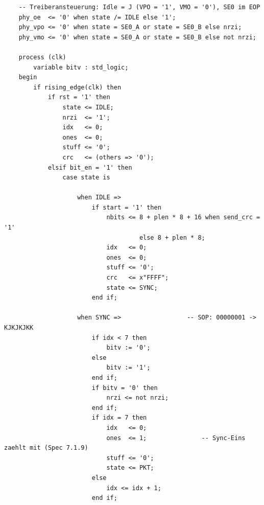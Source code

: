 \documentclass[a4paper,11pt]{article}
\begin{document}
\begin{verbatim}
    -- Treiberansteuerung: Idle = J (VPO = '1', VMO = '0'), SE0 im EOP
    phy_oe  <= '0' when state /= IDLE else '1';
    phy_vpo <= '0' when state = SE0_A or state = SE0_B else nrzi;
    phy_vmo <= '0' when state = SE0_A or state = SE0_B else not nrzi;

    process (clk)
        variable bitv : std_logic;
    begin
        if rising_edge(clk) then
            if rst = '1' then
                state <= IDLE;
                nrzi  <= '1';
                idx   <= 0;
                ones  <= 0;
                stuff <= '0';
                crc   <= (others => '0');
            elsif bit_en = '1' then
                case state is

                    when IDLE =>
                        if start = '1' then
                            nbits <= 8 + plen * 8 + 16 when send_crc = '1'
                                     else 8 + plen * 8;
                            idx   <= 0;
                            ones  <= 0;
                            stuff <= '0';
                            crc   <= x"FFFF";
                            state <= SYNC;
                        end if;

                    when SYNC =>                  -- SOP: 00000001 -> KJKJKJKK
                        if idx < 7 then
                            bitv := '0';
                        else
                            bitv := '1';
                        end if;
                        if bitv = '0' then
                            nrzi <= not nrzi;
                        end if;
                        if idx = 7 then
                            idx   <= 0;
                            ones  <= 1;               -- Sync-Eins zaehlt mit (Spec 7.1.9)
                            stuff <= '0';
                            state <= PKT;
                        else
                            idx <= idx + 1;
                        end if;


\end{verbatim}
\end{document}
